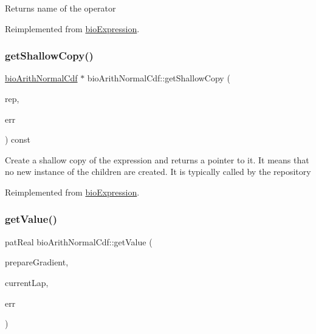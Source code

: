 \begin{DoxyReturn}{Returns}
name of the operator 
\end{DoxyReturn}


Reimplemented from \hyperlink{classbio_expression_a2353a4afb3a2b0af7c63aba086a72bde}{bio\+Expression}.

\mbox{\label{classbio_arith_normal_cdf_af05c8a2c466ed42e1f4b517b35b4be11}} 
\subsubsection{\texorpdfstring{get\+Shallow\+Copy()}{getShallowCopy()}}
{\footnotesize\ttfamily \hyperlink{classbio_arith_normal_cdf}{bio\+Arith\+Normal\+Cdf} $\ast$ bio\+Arith\+Normal\+Cdf\+::get\+Shallow\+Copy (\begin{DoxyParamCaption}\item[{\hyperlink{classbio_expression_repository}{bio\+Expression\+Repository} $\ast$}]{rep,  }\item[{pat\+Error $\ast$\&}]{err }\end{DoxyParamCaption}) const\hspace{0.3cm}{\ttfamily [virtual]}}

Create a shallow copy of the expression and returns a pointer to it. It means that no new instance of the children are created. It is typically called by the repository 

Reimplemented from \hyperlink{classbio_expression_a442534762693b92baaf33928979a1bf8}{bio\+Expression}.

\mbox{\label{classbio_arith_normal_cdf_abf66a564a8a244d62205d19484b63315}} 
\subsubsection{\texorpdfstring{get\+Value()}{getValue()}}
{\footnotesize\ttfamily pat\+Real bio\+Arith\+Normal\+Cdf\+::get\+Value (\begin{DoxyParamCaption}\item[{pat\+Boolean}]{prepare\+Gradient,  }\item[{pat\+U\+Long}]{current\+Lap,  }\item[{pat\+Error $\ast$\&}]{err }\end{DoxyParamCaption})\hspace{0.3cm}{\ttfamily [virtual]}}

